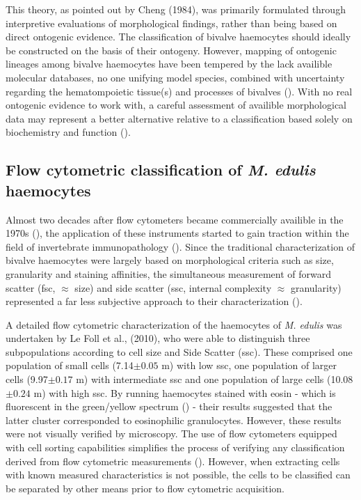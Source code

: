 This theory, as pointed out by Cheng (1984), was primarily formulated through interpretive evaluations of morphological findings, rather than being based on direct ontogenic evidence. The classification of bivalve haemocytes should ideally be constructed on the basis of their ontogeny. However, mapping of ontogenic lineages among bivalve haemocytes have been tempered by the lack availible molecular databases, no one unifying model species, combined with uncertainty regarding the hematompoietic tissue(s) and processes of bivalves (\cite{Hine1999, Smith2016, Pila2016, delaBallina2022}). With no real ontogenic evidence to work with, a careful assessment of availible morphological data may represent a better alternative relative to a classification based solely on biochemistry and function (\cite{Hine1999}). 

\subsection{Flow cytometric classification of \emph{M. edulis} haemocytes}
Almost two decades after flow cytometers became commercially availible in the 1970s (\cite{Shapiro2004}), the application of these instruments started to gain traction within the field of invertebrate immunopathology (\cite{Fisher1988}). Since the traditional characterization of bivalve haemocytes were largely based on morphological criteria such as size, granularity and staining affinities, the simultaneous measurement of forward scatter (\acrshort{fsc}, $\approx$ size) and side scatter (\acrshort{ssc}, internal complexity $\approx$ granularity) represented a far less subjective approach to their characterization (\cite{AshtonAlcox1998, Allam2002, Mateo2009}).

A detailed flow cytometric characterization of the haemocytes of \emph{M. edulis} was undertaken by Le Foll et al., (2010), who were able to distinguish three subpopulations according to cell size and Side Scatter (\acrshort{ssc}). These comprised one population of small cells (7.14$\pm{0.05}$ \micro m) with low \acrshort{ssc}, one population of larger cells (9.97$\pm{0.17}$ \micro m) with intermediate \acrshort{ssc} and one population of large cells (10.08$\pm{0.24}$ \micro m) with high \acrshort{ssc}. By running haemocytes stained with eosin - which is fluorescent in the green/yellow spectrum (\cite{Elfer2016, Koegle2020}) - their results suggested that the latter cluster corresponded to eosinophilic granulocytes. However, these results were not visually verified by microscopy. The use of flow cytometers equipped with cell sorting capabilities simplifies the process of verifying any classification derived from flow cytometric measurements (\cite{Shapiro2004}). However, when extracting cells with known measured characteristics is not possible, the cells to be classified can be separated by other means prior to flow cytometric acquisition.

